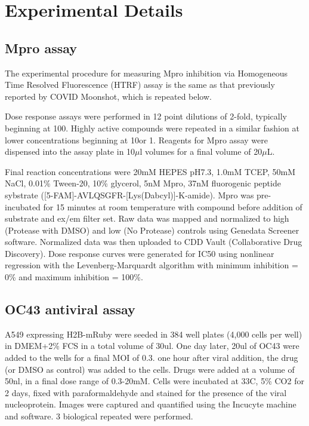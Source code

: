 
\chapter{Experimental Details} \label{appendix:experiments}

\section{Mpro assay} \label{appendix:mpro_assay}
The experimental procedure for measuring Mpro inhibition via Homogeneous Time Resolved Fluorescence (HTRF) assay is the same as that previously reported by COVID Moonshot\cite{Moonshot2022}, which is repeated below.

Dose response assays were performed in 12 point dilutions of 2-fold, typically beginning at 100\uM. Highly active compounds were repeated in a similar fashion at lower concentrations beginning at 10\uM or 1\uM. Reagents for Mpro assay were dispensed into the assay plate in 10$\mu$l volumes for a final volume of 20$\mu$L.

Final reaction concentrations were 20mM HEPES pH7.3, 1.0mM TCEP, 50mM NaCl, 0.01\% Tween-20, 10\% glycerol, 5nM Mpro, 37nM fluorogenic peptide sybstrate ([5-FAM]-AVLQSGFR-[Lys(Dabcyl)]-K-amide). Mpro was pre-incubated for 15 minutes at room temperature with compound before addition of substrate and ex/em filter set. Raw data was mapped and normalized to high (Protease with DMSO) and low (No Protease) controls using Genedata Screener software. Normalized data was then uploaded to CDD Vault (Collaborative Drug Discovery). Dose response curves were generated for IC50 using nonlinear regression with the Levenberg-Marquardt algorithm with minimum inhibition = 0\% and maximum inhibition = 100\%.

\section{OC43 antiviral assay} \label{appendix:oc43_assay}
A549 expressing H2B-mRuby were seeded in 384 well plates (4,000 cells per well) in DMEM+2\% FCS in a total volume of 30ul. One day later, 20ul of OC43 were added to the wells for a final MOI of 0.3. one hour after viral addition, the drug (or DMSO as control) was added to the cells. Drugs were added at a volume of 50nl, in a final dose range of 0.3-20mM. Cells were incubated at 33C, 5\% CO2 for 2 days, fixed with paraformaldehyde and stained for the presence of the viral nucleoprotein. Images were captured and quantified using the Incucyte machine and software. 3 biological repeated were performed.

